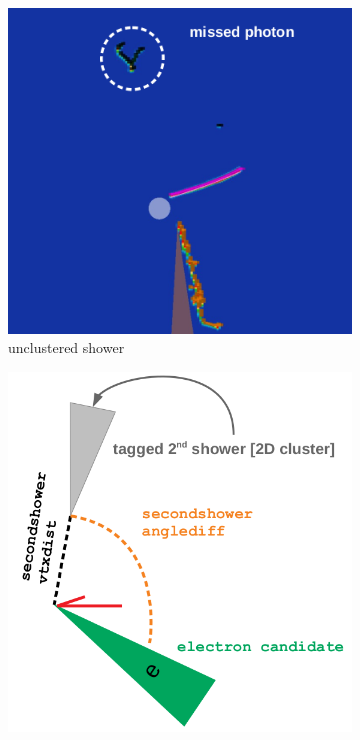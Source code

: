 \begin{figure}[H] 
\begin{center}
    \begin{subfigure}[b]{0.27\textwidth}
    \centering
    \includegraphics[width=1.00\textwidth]{nueselection/variables/secondshowerevd.png}
    \caption{\label{fig:nue:variables:secondshowerevd} unclustered shower }
    \end{subfigure}
    \begin{subfigure}[b]{0.27\textwidth}
    \centering
    \includegraphics[width=1.00\textwidth]{nueselection/variables/secondshower.png}

\end{subfigure}
\end{center}
\end{figure}
